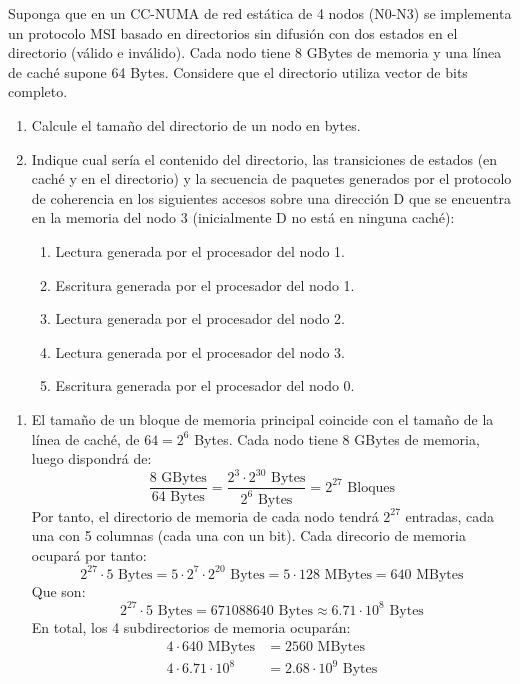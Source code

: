 \begin{ejercicio}
    Suponga que en un CC-NUMA de red estática de 4 nodos (N0-N3) se implementa un protocolo MSI basado en directorios sin difusión con dos estados en el directorio (válido e inválido). Cada nodo tiene 8 GBytes de memoria y una línea de caché supone 64 Bytes. Considere que el directorio utiliza vector de bits completo.
    \begin{enumerate}
        \item Calcule el tamaño del directorio de un nodo en bytes.
        \item Indique cual sería el contenido del directorio, las transiciones de estados (en caché y en el directorio) y la secuencia de paquetes generados por el protocolo de coherencia en los siguientes accesos sobre una dirección D que se encuentra en la memoria del nodo 3 (inicialmente D no está en ninguna caché):
        \begin{enumerate}
            \item Lectura generada por el procesador del nodo 1.
            \item Escritura generada por el procesador del nodo 1.
            \item Lectura generada por el procesador del nodo 2.
            \item Lectura generada por el procesador del nodo 3.
            \item Escritura generada por el procesador del nodo 0.
        \end{enumerate}
    \end{enumerate}

\begin{enumerate}
    \item El tamaño de un bloque de memoria principal coincide con el tamaño de la línea de caché, de $64 = 2^6$ Bytes. Cada nodo tiene 8 GBytes de memoria, luego dispondrá de:
        \begin{equation*}
            \dfrac{8 \text{\ GBytes}}{64 \text{\ Bytes}} = \dfrac{2^3\cdot 2^{30} \text{\ Bytes}}{2^6 \text{\ Bytes}} = 2^{27} \text{\ Bloques}
        \end{equation*}
        Por tanto, el directorio de memoria de cada nodo tendrá $2^{27}$ entradas, cada una con 5 columnas (cada una con un bit). Cada direcorio de memoria ocupará por tanto:
        \begin{equation*}
            2^{27}\cdot 5 \text{\ Bytes} = 5\cdot 2^7\cdot 2^{20} \text{\ Bytes} = 5\cdot 128 \text{\ MBytes} = 640 \text{\ MBytes}
        \end{equation*}
        Que son:
        \begin{equation*}
            2^{27}\cdot 5 \text{\ Bytes} = 671088640 \text{\ Bytes} \approx 6.71\cdot 10^8 \text{\ Bytes}
        \end{equation*}
        En total, los 4 subdirectorios de memoria ocuparán:
        \begin{align*}
            4\cdot 640 \text{\ MBytes} &= 2560 \text{\ MBytes} \\
            4\cdot 6.71\cdot 10^8 &= 2.68\cdot 10^9 \text{\ Bytes}
        \end{align*}


\end{enumerate}
\end{ejercicio}
